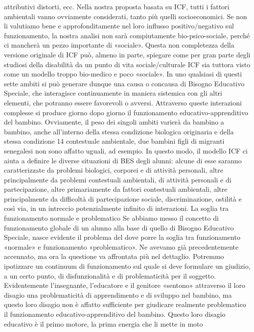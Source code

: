 attributivi distorti, ecc.
Nella nostra proposta basata su ICF, tutti i fattori ambientali vanno ovviamente considerati,
tanto più quelli socioeconomici. Se non li valutiamo bene e approfonditamente nel loro influsso
positivo/negativo sul funzionamento, la nostra analisi non sarà compiutamente bio-psico-sociale,
perché ci mancherà un pezzo importante di «sociale». Questa non completezza della versione
originale di ICF può, almeno in parte, spiegare come per gran parte degli studiosi della disabilità da
un punto di vita sociale/culturale ICF sia tuttora visto come un modello troppo bio-medico e poco
«sociale».
In uno qualsiasi di questi sette ambiti si può generare dunque una causa o concausa di
Bisogno Educativo Speciale, che interagisce continuamente in maniera sistemica con gli altri
elementi, che potranno essere favorevoli o avversi.
Attraverso queste interazioni complesse si produce giorno dopo giorno il funzionamento
educativo-apprenditivo del bambino. Ovviamente, il peso dei singoli ambiti varierà da bambino a
bambino, anche all’interno della stessa condizione biologica originaria e della stessa condizione
14
contestuale ambientale, due bambini figli di migranti senegalesi non sono affatto uguali, ad
esempio.
In questo modo, il modello ICF ci aiuta a definire le diverse situazioni di BES degli alunni:
alcune di esse saranno caratterizzate da problemi biologici, corporei e di attività personali, altre
principalmente da problemi contestuali ambientali, di attività personali e di partecipazione, altre
primariamente da fattori contestuali ambientali, altre principalmente da difficoltà di
partecipazione sociale, discriminazione, ostilità e così via, in un intreccio potenzialmente infinito di
interazioni.
La soglia tra funzionamento normale e problematico
Se abbiamo messo il concetto di funzionamento globale di un alunno alla base di quello di
Bisogno Educativo Speciale, nasce evidente il problema del dove porre la soglia tra funzionamento
«normale» e funzionamento «problematico». Ne avevamo già precedentemente accennato, ma
ora la questione va affrontata più nel dettaglio. Potremmo ipotizzare un continuum di
funzionamento sul quale si deve formulare un giudizio, a un certo punto, di disfunzionalità e di
problematicità per il soggetto.
Evidentemente l’insegnante, l’educatore e il genitore «sentono» attraverso il loro disagio una
problematicità di apprendimento e di sviluppo nel bambino, ma questo loro disagio non è affatto
sufficiente per giudicare realmente problematico il funzionamento educativo-apprenditivo del
bambino. Questo loro disagio educativo è il primo motore, la prima energia che li mette in moto
